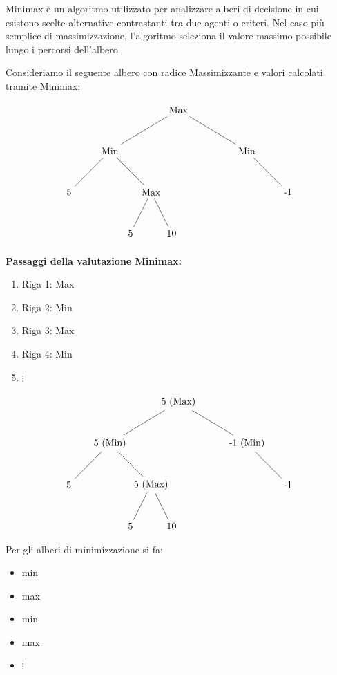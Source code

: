 \documentclass[10pt]{extarticle}
\begin{document}
Minimax è un algoritmo utilizzato per analizzare alberi di decisione in cui esistono scelte alternative contrastanti tra due agenti o criteri. Nel caso più semplice di massimizzazione, l'algoritmo seleziona il valore massimo possibile lungo i percorsi dell'albero. 

Consideriamo il seguente albero con radice Massimizzante e valori calcolati tramite Minimax:

\[
\begin{tikzpicture}[level distance=1.5cm,
  level 1/.style={sibling distance=5cm},
  level 2/.style={sibling distance=3cm},
  level 3/.style={sibling distance=1.5cm}]
\node {Max}
  child {node {Min}
    child {node {5}}
    child {node {Max}
      child {node {5}}
      child {node {10}}
    }
  }
  child {node {Min}
    child [missing]
    child {node {-1}}
  };
\end{tikzpicture}
\]

\vspace{0.5cm}

\textbf{Passaggi della valutazione Minimax:}

\begin{enumerate}
  \item Riga 1: Max
  \item Riga 2: Min
  \item Riga 3: Max
  \item Riga 4: Min
  \item $\vdots$
\end{enumerate}

\vspace{0.5cm}

\[
\begin{tikzpicture}[level distance=1.5cm,
  level 1/.style={sibling distance=5cm},
  level 2/.style={sibling distance=3cm},
  level 3/.style={sibling distance=1.5cm},
  every node/.style={align=center}]
\node {5 (Max)}
  child {node {5 (Min)}
    child {node {5}}
    child {node {5 (Max)} 
      child {node {5}}
      child {node {10}}
    }
  }
  child {node {-1 (Min)}
    child [missing]
    child {node {-1}}
  };
\end{tikzpicture}
\]
Per gli alberi di minimizzazione si fa: 
\begin{itemize}
  \item min
  \item max
  \item min
  \item max
  \item $\vdots$
\end{itemize}
\end{document}
